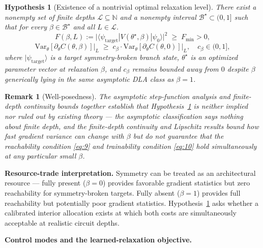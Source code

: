 \documentclass[pdflatex,sn-mathphys-num]{sn-jnl}
\theoremstyle{thmstyleone}
\newtheorem{hypothesis}[theorem]{Hypothesis}
\theoremstyle{thmstyletwo}
\newtheorem{remark}{Remark}
\theoremstyle{thmstylethree}
\begin{document}
\begin{hypothesis}[Existence of a nontrivial optimal relaxation level]
\label{hyp:main}
There exist a nonempty set of finite depths $\mathcal{L} \subseteq \mathbb{N}$ and a nonempty interval $\mathcal{B}^\star \subset (0,1]$ such that for every $\beta \in \mathcal{B}^\star$ and all $L \in \mathcal{L}$.
\begin{equation}
F(\beta, L) := \big|\langle \psi_{\mathrm{target}} | V(\theta^\star,\beta) | \psi_0 \rangle\big|^2 \;\ge\; F_{\min} > 0, \label{eq:9}
\end{equation}
\begin{equation}
\mathrm{Var}_\theta[\partial_\theta C(\theta,\beta)]\big|_L \;\ge\; c_\beta \cdot \mathrm{Var}_\theta[\partial_\theta C(\theta,0)]\big|_L, \quad c_\beta \in (0,1], \label{eq:10}
\end{equation}
where $|\psi_{\mathrm{target}}\rangle$ is a target symmetry-broken branch state, $\theta^\star$ is an optimized parameter vector at relaxation $\beta$, and $c_\beta$ remains bounded away from $0$ despite $\beta$ generically lying in the same asymptotic DLA class as $\beta=1$.
\end{hypothesis}

\begin{remark}[Well-posedness]
\label{rem:wellposed}
The asymptotic step-function analysis and finite-depth continuity bounds together establish that Hypothesis~\ref{hyp:main} is neither implied nor ruled out by existing theory --- the asymptotic classification says nothing about finite depth, and the finite-depth continuity and Lipschitz results bound how fast gradient variance can change with $\beta$ but do not guarantee that the reachability condition \eqref{eq:9} and trainability condition \eqref{eq:10} hold simultaneously at any particular small $\beta$.
\end{remark}

\textbf{Resource-trade interpretation.} Symmetry can be treated as an architectural resource \cite{meyer2023exploiting,schatzki2022theoretical} --- fully present ($\beta=0$) provides favorable gradient statistics but zero reachability for symmetry-broken targets. Fully absent ($\beta=1$) provides full reachability but potentially poor gradient statistics. Hypothesis~\ref{hyp:main} asks whether a calibrated interior allocation exists at which both costs are simultaneously acceptable at realistic circuit depths.

\textbf{Control modes and the learned-relaxation objective.}
\end{document}
